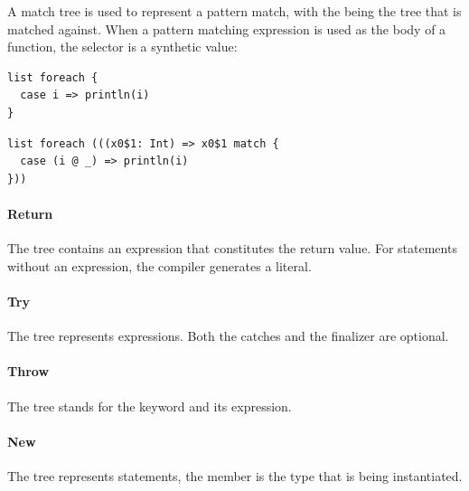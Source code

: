 \noindent A match tree is used to represent a pattern match, with the  being the tree that is matched against. When a pattern matching expression is used as the body of a function, the selector is a synthetic value:

\begin{multicols}{2}
\begin{lstlisting}
list foreach {
  case i => println(i)
}
\end{lstlisting}
\begin{lstlisting}
list foreach (((x0$1: Int) => x0$1 match {
  case (i @ _) => println(i)
}))
\end{lstlisting}
\end{multicols}

\paragraph{Return} 

\noindent The  tree contains an expression that constitutes the return value. For  statements without an expression, the compiler generates a \src{()} literal.

\paragraph{Try} 

\noindent The  tree represents  expressions. Both the catches and the finalizer are optional.

\paragraph{Throw} 

\noindent The  tree stands for the  keyword and its expression.

\paragraph{New} 

\noindent The  tree represents  statements, the  member is the type that is being instantiated.

